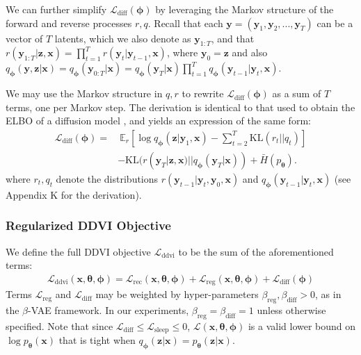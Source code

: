 \documentclass[letterpaper]{article} %
\newcommand{\bx}{\mathbf{x}}
\newcommand{\bz}{\mathbf{z}}
\newcommand{\by}{\mathbf{y}}
\newcommand\Exp{\mathbb{E}}
\newcommand\KL{\text{KL}}
\newcommand\Lc{\mathcal{L}}
\let\oldtheta\theta
\renewcommand{\theta}{{\boldsymbol \oldtheta}}
\let\oldphi\phi
\renewcommand{\phi}{{\boldsymbol \oldphi}}
\begin{document}

We can further simplify $\Lc_\text{diff}(\phi)$ by leveraging the Markov structure of the forward and reverse processes $r, q$.
Recall that each $\by = (\by_1, \by_2, ..., \by_T)$ can be a vector of $T$ latents, which we also denote as $\by_{1:T}$,
and that
$
r(\by_{1:T}|\bz,\bx) =  \prod_{t=1}^T r(\by_t|\by_{t-1},\bx) 
$,
where $\by_0 = \bz$ %
and also
$
q_\phi(\by, \bz | \bx) = q_\phi(\by_{0:T} | \bx) = q_\phi(\by_T | \bx) \prod_{t=1}^T q_\phi(\by_{t-1}|\by_{t},\bx).
$

We may use the Markov structure in $q, r$ to rewrite $\Lc_\text{diff}(\phi)$ as a sum of $T$ terms, one per Markov step. The derivation is identical to that used to obtain the ELBO of a diffusion model \citep{sohl2015deep}, and yields an expression of the same form:
\begin{align}
\Lc_\text{diff}(\phi) = &~\Exp_{r} \left[\log q_\phi(\bz | \by_{1}, \bx)  -  \sum_{t=2}^T  \KL(r_t || q_t) \right] \\ \nonumber
&- \KL(r(\by_T | \bz, \bx) || q_\phi(\by_T | \bx)) + \bar{H}(p_\theta).
\end{align}
where $r_t,q_t$ denote the distributions $r(\by_{t-1} | \by_{t}, \by_0, \bx)$ and $q_\phi(\by_{t-1} | \by_{t}, \bx)$ (see Appendix K for the derivation).

\subsubsection{Regularized DDVI Objective}

We define the full DDVI objective $\Lc_\text{ddvi}$ to be the sum of the aforementioned terms:
\begin{align}
    \Lc_\text{ddvi}(\bx, \theta, \phi) = \Lc_\text{rec}(\bx, \theta, \phi) + \Lc_\text{reg}(\bx, \theta, \phi) + \Lc_\text{diff}(\phi) \nonumber
\end{align}
Terms $\Lc_\text{reg}$ and $\Lc_\text{diff}$ may be weighted by hyper-parameters $\beta_\text{reg}, \beta_\text{diff} > 0$, as in the $\beta$-VAE framework. In our experiments, $\beta_\text{reg} = \beta_\text{diff} = 1$ unless otherwise specified.
Note that since $\Lc_\text{diff} \leq \Lc_\text{sleep} \leq 0$, $\Lc(\bx, \theta, \phi)$ is a valid lower bound on $\log p_\theta(\bx)$ that is tight when $q_\phi(\bz|\bx) = p_\theta(\bz|\bx)$.
\end{document}
